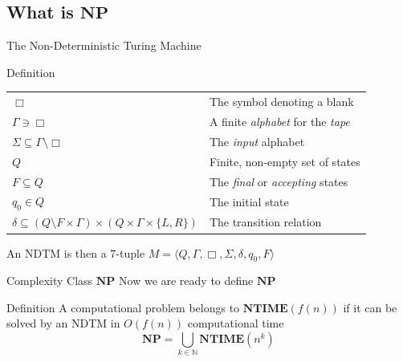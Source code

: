 \documentclass{beamer}
\newcommand{\Natural}{\mathbb{N}}
\newcommand{\NPTIME}{\mathbf{NP}}
\newcommand{\NTIME}{\mathbf{NTIME}}
\begin{document}
  \subsection{What is $\NPTIME$}
  \begin{frame}{The Non-Deterministic Turing Machine}
      \pause
      \begin{block}{Definition}
          \pause
          \begin{table}[]
              \centering
              \begin{tabular}{ll}
                  $\Box$ & The symbol denoting a blank \pause \\
                  $\Gamma \ni \Box$
                  & A finite \textit{alphabet} for the \textit{tape} \pause \\
                  $\Sigma \subseteq \Gamma \setminus \Box$ 
                  & The \textit{input} alphabet \pause \\
                  $Q$ & Finite, non-empty set of states \pause \\
                  $F \subseteq Q$
                  & The \textit{final} or \textit{accepting} states \pause \\
                  $q_0 \in Q$ & The initial state \pause \\
                  $\delta \subseteq (Q \setminus F \times \Gamma ) \times (Q
                  \times \Gamma \times \{L, R\})$ & The transition relation
              \end{tabular}
          \end{table}
          \pause
          An NDTM is then a 7-tuple
          $M = \langle Q, \Gamma, \Box, \Sigma, \delta, q_0, F \rangle$
      \end{block}
  \end{frame}
  \begin{frame}{Complexity Class $\NPTIME$}
      Now we are ready to define $\NPTIME$
      \pause
      \begin{block}{Definition}
          A computational problem belongs to
              $\NTIME\left(f(n)\right)$ if it can be solved by an
              NDTM in $O(f(n))$ computational time 
              \pause
          $$\NPTIME = \bigcup_{k \in \Natural}
              \NTIME\left(n^k\right)$$
      \end{block}
  \end{frame}
\end{document}
